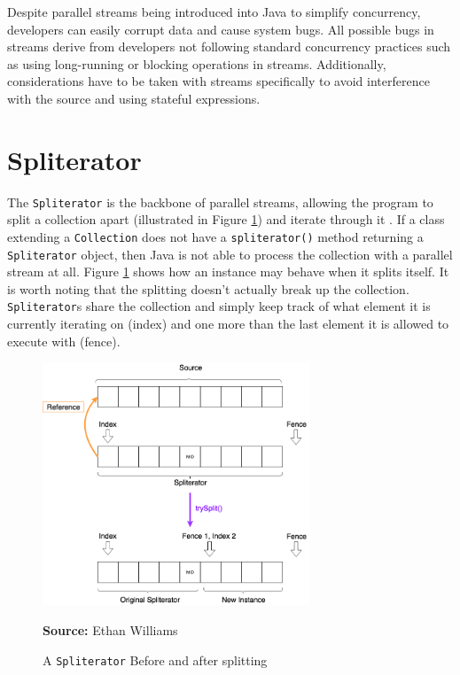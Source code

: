 \documentclass[oneside, 12pt]{article}
\newcommand{\source}[1]{\textbf{Source:} {#1} }
\begin{document}
Despite parallel streams being introduced into Java to simplify concurrency, developers can easily corrupt data and cause system bugs. All possible bugs in streams derive from developers not following standard concurrency practices such as using long-running or blocking operations in streams. Additionally, considerations have to be taken with streams specifically to avoid interference with the source and using stateful expressions.

\section{Spliterator}
The \verb|Spliterator| is the backbone of parallel streams, allowing the program to split a collection apart (illustrated in Figure \ref{fig:split}) and iterate through it \autocite{rapid7_overview}. If a class extending a \verb|Collection| does not have a \verb|spliterator()| method returning a \verb|Spliterator| object, then Java is not able to process the collection with a parallel stream at all. Figure \ref{fig:split} shows how an instance may behave when it splits itself. It is worth noting that the splitting doesn't actually break up the collection. \verb|Spliterator|s share the collection and simply keep track of what element it is currently iterating on (index) and one more than the last element it is allowed to execute with (fence).

\begin{figure}[H]
\centering
\includegraphics[width=8cm]{../images/spliterator.png}
\caption{A {\tt Spliterator} Before and after splitting}
\source{Ethan Williams}
\label{fig:split}
\end{figure}
\end{document}
